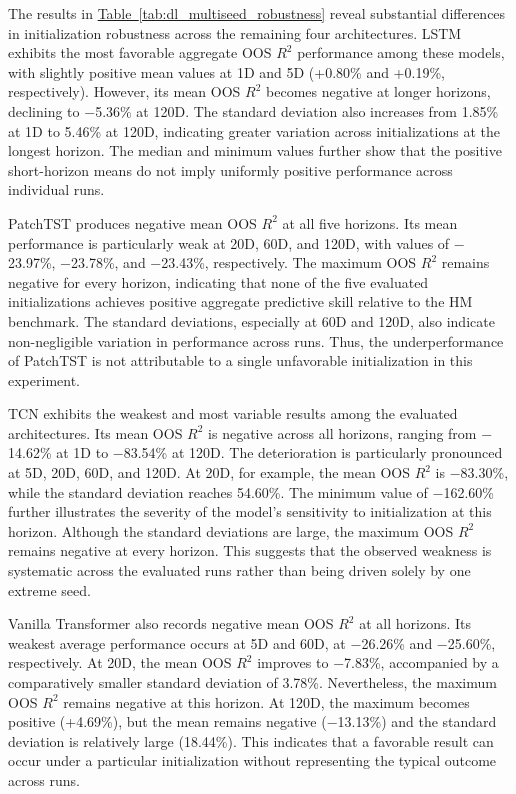 \documentclass[runningheads,orivec]{llncs}
\begin{document}
The results in \hyperref[tab:dl_multiseed_robustness]{Table~\ref*{tab:dl_multiseed_robustness}} reveal substantial differences in initialization robustness across the remaining four architectures. LSTM exhibits the most favorable aggregate OOS $R^2$ performance among these models, with slightly positive mean values at 1D and 5D (+0.80\% and +0.19\%, respectively). However, its mean OOS $R^2$ becomes negative at longer horizons, declining to $-$5.36\% at 120D. The standard deviation also increases from 1.85\% at 1D to 5.46\% at 120D, indicating greater variation across initializations at the longest horizon. The median and minimum values further show that the positive short-horizon means do not imply uniformly positive performance across individual runs.

PatchTST produces negative mean OOS $R^2$ at all five horizons. Its mean performance is particularly weak at 20D, 60D, and 120D, with values of $-$23.97\%, $-$23.78\%, and $-$23.43\%, respectively. The maximum OOS $R^2$ remains negative for every horizon, indicating that none of the five evaluated initializations achieves positive aggregate predictive skill relative to the HM benchmark. The standard deviations, especially at 60D and 120D, also indicate non-negligible variation in performance across runs. Thus, the underperformance of PatchTST is not attributable to a single unfavorable initialization in this experiment.

TCN exhibits the weakest and most variable results among the evaluated architectures. Its mean OOS $R^2$ is negative across all horizons, ranging from $-$14.62\% at 1D to $-$83.54\% at 120D. The deterioration is particularly pronounced at 5D, 20D, 60D, and 120D. At 20D, for example, the mean OOS $R^2$ is $-$83.30\%, while the standard deviation reaches 54.60\%. The minimum value of $-$162.60\% further illustrates the severity of the model's sensitivity to initialization at this horizon. Although the standard deviations are large, the maximum OOS $R^2$ remains negative at every horizon. This suggests that the observed weakness is systematic across the evaluated runs rather than being driven solely by one extreme seed.

Vanilla Transformer also records negative mean OOS $R^2$ at all horizons. Its weakest average performance occurs at 5D and 60D, at $-$26.26\% and $-$25.60\%, respectively. At 20D, the mean OOS $R^2$ improves to $-$7.83\%, accompanied by a comparatively smaller standard deviation of 3.78\%. Nevertheless, the maximum OOS $R^2$ remains negative at this horizon. At 120D, the maximum becomes positive (+4.69\%), but the mean remains negative ($-$13.13\%) and the standard deviation is relatively large (18.44\%). This indicates that a favorable result can occur under a particular initialization without representing the typical outcome across runs.
\end{document}
